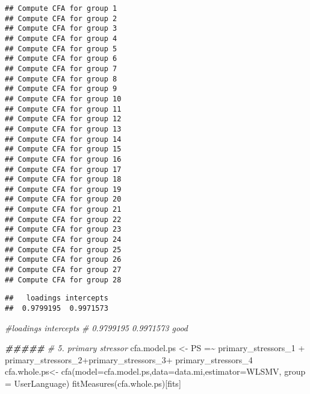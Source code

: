 \documentclass[
]{article}
\newenvironment{Shaded}{\begin{snugshade}}{\end{snugshade}}
\newcommand{\AttributeTok}[1]{\textcolor[rgb]{0.77,0.63,0.00}{#1}}
\newcommand{\CommentTok}[1]{\textcolor[rgb]{0.56,0.35,0.01}{\textit{#1}}}
\newcommand{\DocumentationTok}[1]{\textcolor[rgb]{0.56,0.35,0.01}{\textbf{\textit{#1}}}}
\newcommand{\FloatTok}[1]{\textcolor[rgb]{0.00,0.00,0.81}{#1}}
\newcommand{\FunctionTok}[1]{\textcolor[rgb]{0.00,0.00,0.00}{#1}}
\newcommand{\NormalTok}[1]{#1}
\newcommand{\OtherTok}[1]{\textcolor[rgb]{0.56,0.35,0.01}{#1}}
\newcommand{\SpecialCharTok}[1]{\textcolor[rgb]{0.00,0.00,0.00}{#1}}
\newcommand{\StringTok}[1]{\textcolor[rgb]{0.31,0.60,0.02}{#1}}
\begin{document}
\begin{verbatim}
## Compute CFA for group 1
## Compute CFA for group 2
## Compute CFA for group 3
## Compute CFA for group 4
## Compute CFA for group 5
## Compute CFA for group 6
## Compute CFA for group 7
## Compute CFA for group 8
## Compute CFA for group 9
## Compute CFA for group 10
## Compute CFA for group 11
## Compute CFA for group 12
## Compute CFA for group 13
## Compute CFA for group 14
## Compute CFA for group 15
## Compute CFA for group 16
## Compute CFA for group 17
## Compute CFA for group 18
## Compute CFA for group 19
## Compute CFA for group 20
## Compute CFA for group 21
## Compute CFA for group 22
## Compute CFA for group 23
## Compute CFA for group 24
## Compute CFA for group 25
## Compute CFA for group 26
## Compute CFA for group 27
## Compute CFA for group 28
\end{verbatim}

\begin{Shaded}
\end{Shaded}

\begin{verbatim}
##   loadings intercepts 
##  0.9799195  0.9971573
\end{verbatim}

\begin{Shaded}
\begin{Highlighting}[]
\CommentTok{\#loadings intercepts }
\CommentTok{\# 0.9799195  0.9971573     good}


\DocumentationTok{\#\#\#\#\#}
\CommentTok{\# 5. primary stressor}
\NormalTok{cfa.model.ps }\OtherTok{\textless{}{-}} \StringTok{\textquotesingle{}PS =\textasciitilde{} primary\_stressors\_1 + primary\_stressors\_2+primary\_stressors\_3+}
\StringTok{  primary\_stressors\_4\textquotesingle{}}
\NormalTok{cfa.whole.ps}\OtherTok{\textless{}{-}} \FunctionTok{cfa}\NormalTok{(}\AttributeTok{model=}\NormalTok{cfa.model.ps,}\AttributeTok{data=}\NormalTok{data.mi,}\AttributeTok{estimator=}\StringTok{\textquotesingle{}WLSMV\textquotesingle{}}\NormalTok{, }\AttributeTok{group =} 
                             \StringTok{\textquotesingle{}UserLanguage\textquotesingle{}}\NormalTok{)}
\FunctionTok{fitMeasures}\NormalTok{(cfa.whole.ps)[fits]}
\end{Highlighting}
\end{Shaded}
\end{document}
